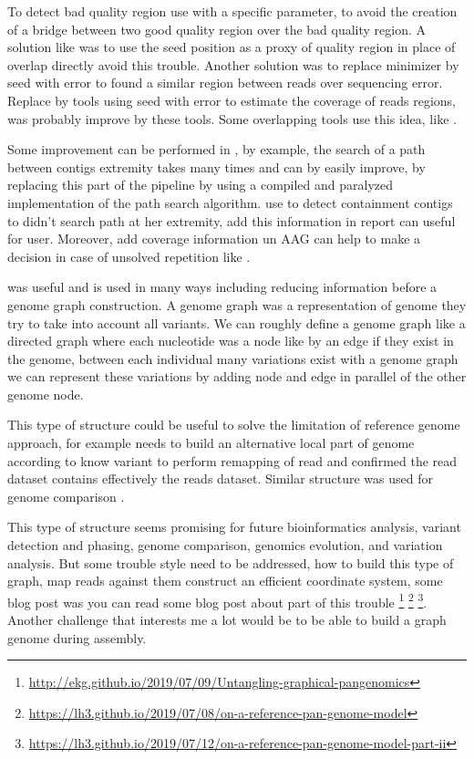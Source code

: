 \documentclass[main.tex]{subfiles}
\begin{document}
To detect bad quality region \yacrd use \minimap with a specific parameter, to avoid the creation of a bridge between two good quality region over the bad quality region. A solution like \miniscrub was to use the seed position as a proxy of quality region in place of overlap directly avoid this trouble. Another solution was to replace minimizer by seed with error to found a similar region between reads over sequencing error. Replace \minimap by tools using seed with error to estimate the coverage of reads regions, was probably improve by these tools. Some overlapping tools use this idea, like \cite{GroupK}.

Some improvement can be performed in \knot, by example, the search of a path between contigs extremity takes many times and can by easily improve, by replacing this part of the pipeline by using a compiled and paralyzed implementation of the path search algorithm. \knot use \minimap to detect containment contigs to didn't search path at her extremity, add this information in \knot report can useful for user. Moreover, add coverage information un AAG can help to make a decision in case of unsolved repetition like \flye.

\fpa was useful and is used in many ways including reducing information before a genome graph construction. A genome graph was a representation of genome they try to take into account all variants. We can roughly define a genome graph like a directed graph where each nucleotide was a node like by an edge if they exist in the genome, between each individual many variations exist with a genome graph we can represent these variations by adding node and edge in parallel of the other genome node.

This type of structure could be useful to solve the limitation of reference genome approach, for example  \cite{whatshap} needs to build an alternative local part of genome according to know variant to perform remapping of read and confirmed the read dataset contains effectively the reads dataset. Similar structure was used for genome comparison  \cite{cactus_graph}.

This type of structure seems promising for future bioinformatics analysis, variant detection and phasing, genome comparison,  genomics evolution, and variation analysis. But some trouble style need to be addressed, how to build this type of graph, map reads against them construct an efficient coordinate system, some blog post was you can read some blog post about part of this trouble \footnote{\url{http://ekg.github.io/2019/07/09/Untangling-graphical-pangenomics}} \footnote{\url{https://lh3.github.io/2019/07/08/on-a-reference-pan-genome-model}} \footnote{\url{https://lh3.github.io/2019/07/12/on-a-reference-pan-genome-model-part-ii}}. Another challenge that interests me a lot would be to be able to build a graph genome during assembly.





\end{document}
